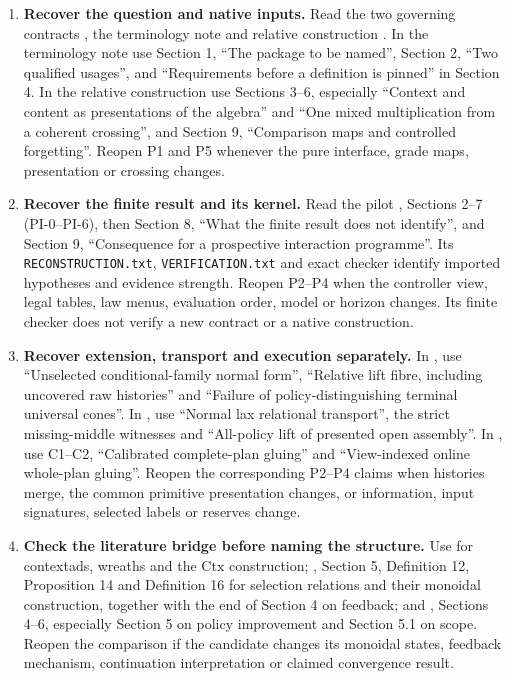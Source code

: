 \documentclass[11pt]{article}
\begin{document}
\begin{enumerate}[label=\textbf{S\arabic*.}]
\item \textbf{Recover the question and native inputs.}
Read the two governing contracts \cite{contracts}, the terminology note and relative construction \cite{native}. In the terminology note use Section 1, ``The package to be named'', Section 2, ``Two qualified usages'', and ``Requirements before a definition is pinned'' in Section 4. In the relative construction use Sections 3--6, especially ``Context and content as presentations of the algebra'' and ``One mixed multiplication from a coherent crossing'', and Section 9, ``Comparison maps and controlled forgetting''. Reopen P1 and P5 whenever the pure interface, grade maps, presentation or crossing changes.

\item \textbf{Recover the finite result and its kernel.}
Read the pilot \cite{pilot}, Sections 2--7 (PI-0--PI-6), then Section 8, ``What the finite result does not identify'', and Section 9, ``Consequence for a prospective interaction programme''. Its \texttt{RECONSTRUCTION.txt}, \texttt{VERIFICATION.txt} and exact checker identify imported hypotheses and evidence strength. Reopen P2--P4 when the controller view, legal tables, law menus, evaluation order, model or horizon changes. Its finite checker does not verify a new contract or a native construction.

\item \textbf{Recover extension, transport and execution separately.}
In \cite{conditional}, use ``Unselected conditional-family normal form'', ``Relative lift fibre, including uncovered raw histories'' and ``Failure of policy-distinguishing terminal universal cones''. In \cite{transport}, use ``Normal lax relational transport'', the strict missing-middle witnesses and ``All-policy lift of presented open assembly''. In \cite{controllers}, use C1--C2, ``Calibrated complete-plan gluing'' and ``View-indexed online whole-plan gluing''. Reopen the corresponding P2--P4 claims when histories merge, the common primitive presentation changes, or information, input signatures, selected labels or reserves change.

\item \textbf{Check the literature bridge before naming the structure.}
Use \cite{cm} for contextads, wreaths and the \(\mathrm{Ctx}\) construction; \cite{cyber}, Section 5, Definition 12, Proposition 14 and Definition 16 for selection relations and their monoidal construction, together with the end of Section 4 on feedback; and \cite{rl}, Sections 4--6, especially Section 5 on policy improvement and Section 5.1 on scope. Reopen the comparison if the candidate changes its monoidal states, feedback mechanism, continuation interpretation or claimed convergence result.
\end{enumerate}
\end{document}
